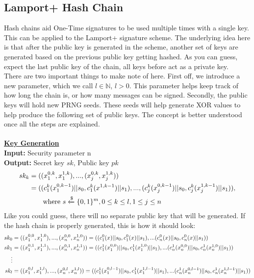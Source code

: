 \documentclass[]{scrartcl}
\makeatletter
\newcommand{\mathcenter}{\@fleqnfalse}
\makeatother
\begin{document}
\subsection*{Lamport+ Hash Chain}
Hash chains aid One-Time signatures to be used multiple times with a single key. This can be applied to the Lamport+ signature scheme. The underlying idea here is that after the public key is generated in the scheme, another set of keys are generated based on the previous public key getting hashed. As you can guess, expect the last public key of the chain, all keys before act as a private key.\\
There are two important things to make note of here. First off, we introduce a new parameter, which we call $l \in \mathbb{N}$, $l > 0$. This parameter helps keep track of how long the chain is, or how many messages can be signed. Secondly, the public keys will hold new PRNG seeds. These seeds will help generate XOR values to help produce the following set of public keys. The concept is better understood once all the steps are explained.\\ \\
\textbf{\underline{Key Generation}}\\
\textbf{Input:} Security parameter n \\
\textbf{Output:} Secret key $sk$, Public key $pk$
\mathcenter
\begin{equation}
\begin{split}
sk_k & = ((x_{1}^{0,k}, x_{1}^{1,k}),...,(x_{j}^{0,k}, x_{j}^{1,k}))\\
& = ((c^k_1(x^{0,k-1}_1)||s_0,c^k_1(x^{1,k-1})||s_1),...,(c^k_j(x^{0,k-1}_j)||s_0,c^k_j(x^{1,k-1}_j)||s_1)), \\
& \hspace{0.7cm} \textrm{where } s\xleftarrow{\$} \{0,1\}^m, 0 \leq k \leq l, 1 \leq j \leq n\\
\end{split}
\end{equation}
Like you could guess, there will no separate public key that will be generated. If the hash chain is properly generated, this is how it should look:
\begin{equation}
\begin{split}
\hspace{-2cm}sk_0 & = ((x_{1}^{0,0}, x_{1}^{1,0}),...,(x_{n}^{0,0}, x_{n}^{1,0})) = ((c^0_1(x)||s_0,c^0_1(x)||s_1),...(c^0_n(x)||s_0,c^0_n(x)||s_1))\\
sk_1 & = ((x_{1}^{0,1}, x_{1}^{1,1}),...,(x_{n}^{0,1}, x_{n}^{1,1})) = ((c^1_1(x_{1}^{0,0})||s_0,c^1_1(x_{1}^{1,0})||s_1),...(c^1_n(x_{n}^{0,0})||s_0,c^1_n(x_{n}^{1,0})||s_1))\\
\vdots\\ 
sk_l & = ((x_{1}^{0,l}, x_{1}^{1,l}),...,(x_{n}^{0,l}, x_{n}^{1,l})) = ((c^1_1(x_{1}^{0,l-1})||s_0,c^1_1(x_{1}^{1,l-1})||s_1),...(c^1_n(x_{n}^{0,l-1})||s_0,c^1_n(x_{n}^{1,l-1})||s_1))
\end{split}
\end{equation}
\end{document}
